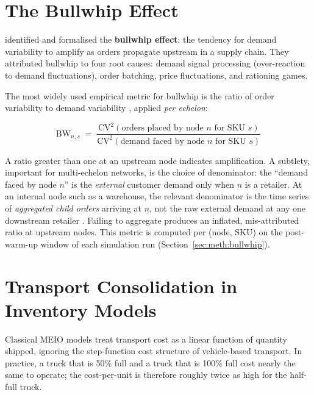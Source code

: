 \section{The Bullwhip Effect}
\label{sec:lit:bullwhip}

\citet{LeeEtAl1997} identified and formalised the \textbf{bullwhip
effect}: the tendency for demand variability to amplify as orders
propagate upstream in a supply chain.  They attributed bullwhip to four
root causes: demand signal processing (over-reaction to demand
fluctuations), order batching, price fluctuations, and rationing games.

The most widely used empirical metric for bullwhip is the ratio of order
variability to demand variability \citep{ChenEtAl2000}, applied
\emph{per echelon}:

\begin{equation}
  \text{BW}_{n,s} \;=\;
  \frac{\text{CV}^2(\text{orders placed by node } n \text{ for SKU } s)}
       {\text{CV}^2(\text{demand faced by node } n \text{ for SKU } s)}
\end{equation}

A ratio greater than one at an upstream node indicates amplification.
A subtlety, important for multi-echelon networks, is the choice of
denominator: the ``demand faced by node $n$'' is the \emph{external}
customer demand only when $n$ is a retailer.  At an internal node such
as a warehouse, the relevant denominator is the time series of
\emph{aggregated child orders} arriving at $n$, not the raw external
demand at any one downstream retailer \citep{LeeEtAl1997}.  Failing to
aggregate produces an inflated, mis-attributed ratio at upstream nodes.
This metric is computed per (node, SKU) on the post-warm-up window of
each simulation run (Section~\ref{sec:meth:bullwhip}).

\section{Transport Consolidation in Inventory Models}
\label{sec:lit:transport}

Classical MEIO models treat transport cost as a linear function of
quantity shipped, ignoring the step-function cost structure of
vehicle-based transport.  In practice, a truck that is 50\% full
and a truck that is 100\% full cost nearly the same to operate; the
cost-per-unit is therefore roughly twice as high for the half-full truck.

